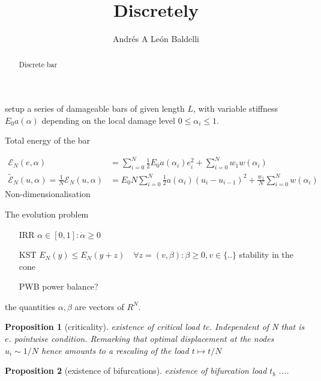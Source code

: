 \documentclass[]{article}
\title{
Discretely \\
}
\author{Andrés A León Baldelli}
\newtheorem{prop}{Proposition}
\begin{document}
    \ifpdf
    \else
    \fi
    
    \maketitle
    
    
    \begin{abstract}
        Discrete bar
    \end{abstract}
    
    setup
a series of damageable bars of given length $L$, with variable stiffness $E_0a(\alpha)$ depending on the local damage level $0\leq \alpha_i \leq 1$.


Total energy of the bar

$$
\begin{aligned}
\mathcal E_N (e, \alpha) &=  \sum_{i=0}^N \frac{1}{2} E_0   a(\alpha_i)  e_i^2  + \sum_{i=0}^N {w_1}w(\alpha_i) \\
\tilde {\mathcal E}_N (u, \alpha) = \frac{1}{N} {\mathcal E}_N (u, \alpha) &=  E_0 N\sum_{i=0}^N \frac{1}{2}  a(\alpha_i)  (u_i-u_{i-1})^2  + \frac{w_1}{N} \sum_{i=0}^N w(\alpha_i) 
\end{aligned}
$$
Non-dimensionalisation

The evolution problem

\begin{itemize}
    \item[IRR] $\alpha \in [0,1] : \dot \alpha \geq 0$
    \item[KST] $E_N(y) \leq E_N(y + z) \quad \forall z = (v, \beta): \beta \geq 0, v \in \{ .. \}$ stability in the cone
    \item[PWB] power balance? 
\end{itemize}
the quantities $\alpha, \beta$ are vectors of $R^N$.

\begin{prop}[criticality] existence of critical load tc. Independent of N that is $e$. pointwise condition. Remarking that optimal displacement at the nodes $u_i \sim 1/N$ hence amounts to a rescaling of the load $t\mapsto t/N$
\end{prop}

\begin{prop}[existence of bifurcations] existence of bifurcation load $t_b$ ....
\end{prop}
\end{document}
